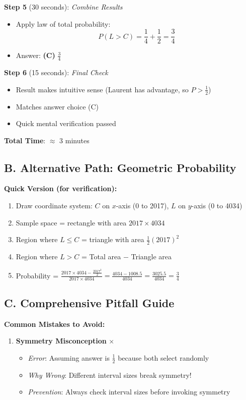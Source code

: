 \documentclass[]{article}
\begin{document}
\begin{solutionbox}
\textbf{Step 5} (30 seconds): \textit{Combine Results}
\begin{itemize}[leftmargin=*]
    \item Apply law of total probability:
    \[P(L > C) = \frac{1}{4} + \frac{1}{2} = \frac{3}{4}\]
    \item Answer: \textbf{(C)} $\frac{3}{4}$
\end{itemize}

\textbf{Step 6} (15 seconds): \textit{Final Check}
\begin{itemize}[leftmargin=*]
    \item Result makes intuitive sense (Laurent has advantage, so $P > \frac{1}{2}$)
    \item Matches answer choice (C)
    \item Quick mental verification passed
\end{itemize}

\textbf{Total Time}: $\approx$ 3 minutes

\subsection*{B. Alternative Path: Geometric Probability}

\textbf{Quick Version (for verification):}
\begin{enumerate}
    \item Draw coordinate system: $C$ on $x$-axis (0 to 2017), $L$ on $y$-axis (0 to 4034)
    \item Sample space = rectangle with area $2017 \times 4034$
    \item Region where $L \leq C$ = triangle with area $\frac{1}{2}(2017)^2$
    \item Region where $L > C$ = Total area $-$ Triangle area
    \item Probability = $\frac{2017 \times 4034 - \frac{2017^2}{2}}{2017 \times 4034} = \frac{4034 - 1008.5}{4034} = \frac{3025.5}{4034} = \frac{3}{4}$
\end{enumerate}

\subsection*{C. Comprehensive Pitfall Guide}

\textbf{Common Mistakes to Avoid:}

\begin{enumerate}
    \item \textbf{Symmetry Misconception} {\color{red}$\times$}
    \begin{itemize}
        \item \textit{Error}: Assuming answer is $\frac{1}{2}$ because both select randomly
        \item \textit{Why Wrong}: Different interval sizes break symmetry!
        \item \textit{Prevention}: Always check interval sizes before invoking symmetry
    \end{itemize}
    

\end{enumerate}
\end{solutionbox}
\end{document}
